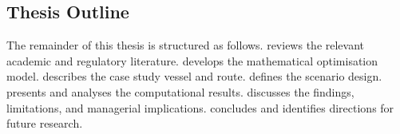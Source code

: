 \subsection{Thesis Outline}
\label{sec:intro:outline}

The remainder of this thesis is structured as follows.
 reviews the relevant academic and regulatory
literature.  develops the mathematical optimisation model.
 describes the case study vessel and route.
 defines the scenario design. 
presents and analyses the computational results. 
discusses the findings, limitations, and managerial implications.
 concludes and identifies directions for future
research.
